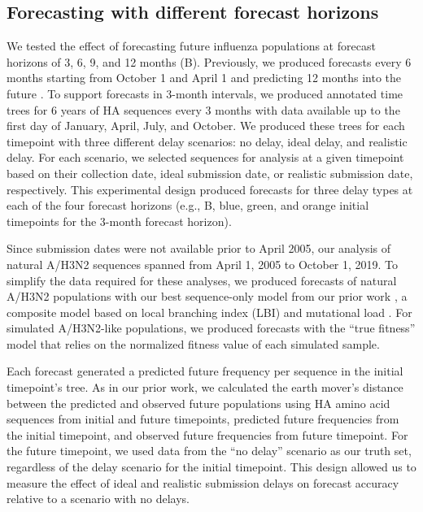 \documentclass[9pt,lineno]{elife}
\begin{document}
\subsection{Forecasting with different forecast horizons}

We tested the effect of forecasting future influenza populations at forecast horizons of 3, 6, 9, and 12 months (B).
Previously, we produced forecasts every 6 months starting from October 1 and April 1 and predicting 12 months into the future \citep{Huddleston2020}.
To support forecasts in 3-month intervals, we produced annotated time trees for 6 years of HA sequences every 3 months with data available up to the first day of January, April, July, and October.
We produced these trees for each timepoint with three different delay scenarios: no delay, ideal delay, and realistic delay.
For each scenario, we selected sequences for analysis at a given timepoint based on their collection date, ideal submission date, or realistic submission date, respectively.
This experimental design produced forecasts for three delay types at each of the four forecast horizons (e.g., B, blue, green, and orange initial timepoints for the 3-month forecast horizon).

Since submission dates were not available prior to April 2005, our analysis of natural A/H3N2 sequences spanned from April 1, 2005 to October 1, 2019.
To simplify the data required for these analyses, we produced forecasts of natural A/H3N2 populations with our best sequence-only model from our prior work \citep{Huddleston2020}, a composite model based on local branching index (LBI) \citep{Neher:2014eu} and mutational load \citep{Luksza:2014hj}.
For simulated A/H3N2-like populations, we produced forecasts with the ``true fitness'' model that relies on the normalized fitness value of each simulated sample.

Each forecast generated a predicted future frequency per sequence in the initial timepoint's tree.
As in our prior work, we calculated the earth mover's distance \citep{Rubner1998} between the predicted and observed future populations using HA amino acid sequences from initial and future timepoints, predicted future frequencies from the initial timepoint, and observed future frequencies from future timepoint.
For the future timepoint, we used data from the ``no delay'' scenario as our truth set, regardless of the delay scenario for the initial timepoint.
This design allowed us to measure the effect of ideal and realistic submission delays on forecast accuracy relative to a scenario with no delays.
\end{document}
